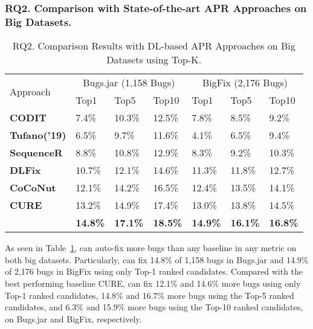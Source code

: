 \subsubsection{RQ2. Comparison with State-of-the-art APR Approaches on Big Datasets.}

\begin{table}[t]
	\caption{RQ2. Comparison Results with DL-based APR Approaches on Big Datasets using Top-K.}
	\vspace{-10pt}
	\begin{center}
		\renewcommand{\arraystretch}{1}
		\begin{tabular}{p{1.6cm}|p{0.7cm}|p{0.7cm}|p{0.7cm}|p{0.7cm}|p{0.7cm}|p{0.7cm}}\hline
			\multirow{2}{*}{Approach}&\multicolumn{3}{c|}{Bugs.jar (1,158 Bugs)}&\multicolumn{3}{c}{BigFix (2,176 Bugs)}\\\cline{2-7}
		                          & Top1   & Top5   & Top10  & Top1   & Top5   & Top10\\
			\hline
			\textbf{CODIT}        & 7.4\%  & 10.3\% & 12.5\% & 7.8\%  & 8.5\%  & 9.2\%\\
			\textbf{Tufano('19)}  & 6.5\%  & 9.7\%  & 11.6\% & 4.1\%  & 6.5\%  & 9.4\%\\
			\textbf{SequenceR}    & 8.8\%  & 10.8\% & 12.9\% & 8.3\%  & 9.2\%  & 10.3\%\\
			\textbf{DLFix}        & 10.7\% & 12.1\% & 14.6\% & 11.3\% & 11.8\% & 12.7\%\\
			\textbf{CoCoNut}      & 12.1\% & 14.2\% & 16.5\% & 12.4\% & 13.5\% & 14.1\%\\
			\textbf{CURE}         & 13.2\% & 14.9\% & 17.4\% & 13.0\% & 13.8\% & 14.5\%\\
			\hline
			\textbf{\tool}        & \textbf{14.8\%} & \textbf{17.1\%} & \textbf{18.5\%} & \textbf{14.9\%} & \textbf{16.1\%} & \textbf{16.8\%}\\
			\hline
		\end{tabular}
		\label{RQ2_results}
	\end{center}
\end{table}


As seen in Table~\ref{RQ2_results}, {\tool} can auto-fix more bugs than any baseline in any metric on both big datasets. 
Particularly, {\tool} can fix 14.8\% of 1,158 bugs in Bugs.jar and 14.9\% of 2,176 bugs in BigFix using only Top-1 ranked candidates. Compared with the best performing baseline CURE, {\tool} can 
fix 12.1\% and 14.6\% more bugs using only Top-1 ranked candidates,  14.8\% and 16.7\% more bugs using the Top-5 ranked candidates, and 6.3\% and 15.9\% more bugs using the Top-10 ranked candidates, on Bugs.jar and BigFix, respectively. 
